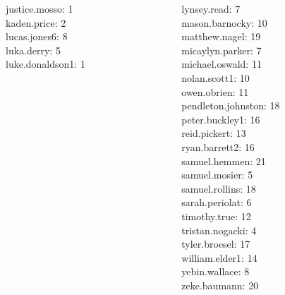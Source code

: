 \documentclass[10pt]{beamer}
\begin{document}
\begin{frame}
\begin{columns}
\begin{column}{0.33\textwidth}
justice.mosso: 1 \\ 
kaden.price: 2 \\ 
lucas.jones6: 8 \\ 
luka.derry: 5 \\ 
luke.donaldson1: 1 \\\end{column}
\begin{column}{0.33\textwidth}
lynsey.read: 7 \\ 
mason.barnocky: 10 \\ 
matthew.nagel: 19 \\ 
micaylyn.parker: 7 \\ 
michael.oswald: 11 \\ 
nolan.scott1: 10 \\ 
owen.obrien: 11 \\ 
pendleton.johnston: 18 \\ 
peter.buckley1: 16 \\ 
reid.pickert: 13 \\ 
ryan.barrett2: 16 \\ 
samuel.hemmen: 21 \\ 
samuel.mosier: 5 \\ 
samuel.rollins: 18 \\ 
sarah.periolat: 6 \\ 
timothy.true: 12 \\ 
tristan.nogacki: 4 \\ 
tyler.broesel: 17 \\ 
william.elder1: 14 \\ 
yebin.wallace: 8 \\ 
zeke.baumann: 20 \\\end{column}
\end{columns}
\vfill
\end{frame}
\end{document}
